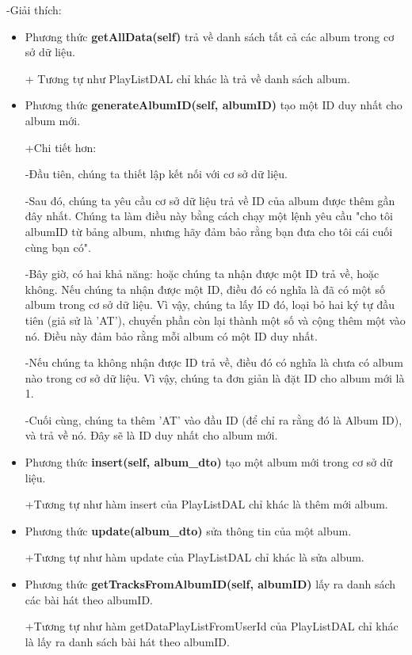 \documentclass[a4paper]{article}
\begin{document}
\clearpage
\newpage
\begin{flushleft}
	-Giải thích:
	\begin{itemize}
		\item Phương thức \textbf{getAllData(self)} trả về danh sách tất cả các album trong cơ sở dữ liệu.
		      \begin{flushleft}
			      + Tương tự như PlayListDAL chỉ khác là trả về danh sách album.
		      \end{flushleft}
		\item Phương thức \textbf{generateAlbumID(self, albumID)} tạo một ID duy nhất cho album mới.
		      \begin{flushleft}
			      +Chi tiết hơn:

			      -Đầu tiên, chúng ta thiết lập kết nối với cơ sở dữ liệu.

			      -Sau đó, chúng ta yêu cầu cơ sở dữ liệu trả về ID của album được thêm gần đây nhất. Chúng ta làm điều này bằng cách chạy một lệnh yêu cầu "cho tôi albumID từ bảng album, nhưng hãy đảm bảo rằng bạn đưa cho tôi cái cuối cùng bạn có".

			      -Bây giờ, có hai khả năng: hoặc chúng ta nhận được một ID trả về, hoặc không. Nếu chúng ta nhận được một ID, điều đó có nghĩa là đã có một số album trong cơ sở dữ liệu. Vì vậy, chúng ta lấy ID đó, loại bỏ hai ký tự đầu tiên (giả sử là 'AT'), chuyển phần còn lại thành một số và cộng thêm một vào nó. Điều này đảm bảo rằng mỗi album có một ID duy nhất.

			      -Nếu chúng ta không nhận được ID trả về, điều đó có nghĩa là chưa có album nào trong cơ sở dữ liệu. Vì vậy, chúng ta đơn giản là đặt ID cho album mới là 1.

			      -Cuối cùng, chúng ta thêm 'AT' vào đầu ID (để chỉ ra rằng đó là Album ID), và trả về nó. Đây sẽ là ID duy nhất cho album mới.
		      \end{flushleft}
		\item Phương thức \textbf{insert(self, album\_dto)} tạo một album mới trong cơ sở dữ liệu.
		      \begin{flushleft}
			      +Tương tự như hàm insert của PlayListDAL chỉ khác là thêm mới album.
		      \end{flushleft}
		\item Phương thức \textbf{update(album\_dto)} sửa thông tin của một album.
		      \begin{flushleft}
			      +Tương tự như hàm update của PlayListDAL chỉ khác là sửa album.
		      \end{flushleft}
		\item Phương thức \textbf{getTracksFromAlbumID(self, albumID)} lấy ra danh sách các bài hát theo albumID.
		      \begin{flushleft}
			      +Tương tự như hàm getDataPlayListFromUserId của PlayListDAL chỉ khác là lấy ra danh sách bài hát theo albumID.
		      \end{flushleft}
	\end{itemize}
\end{flushleft}
\clearpage
\end{document}
